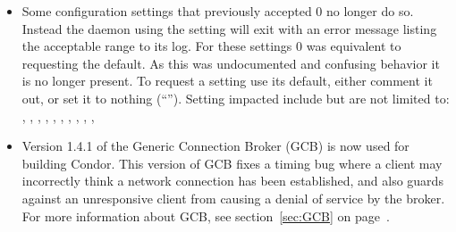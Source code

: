 \begin{itemize}
\item Some configuration settings that previously accepted 0 no
  longer do so.  Instead the daemon using the setting will exit
  with an error message listing the acceptable range to its log.
  For these settings 0 was equivalent to requesting the default.
  As this was undocumented and confusing behavior it is no longer
  present.  To request a setting use its default, either comment it
  out, or set it to nothing (``'').
  Setting impacted include but are not limited to: 
  ,
  ,
  ,
  ,
  ,
  ,
  ,
  ,
  ,
  ,

\item Version 1.4.1 of the Generic Connection Broker (GCB) is
  now used for building Condor.  This version of GCB fixes a timing bug
  where a client may incorrectly think a network connection has been established,
  and also guards against an unresponsive client from causing a denial of
  service by the broker.
  For more information about GCB, see section~\ref{sec:GCB} on
  page~\pageref{sec:GCB}. 

%

\end{itemize}


